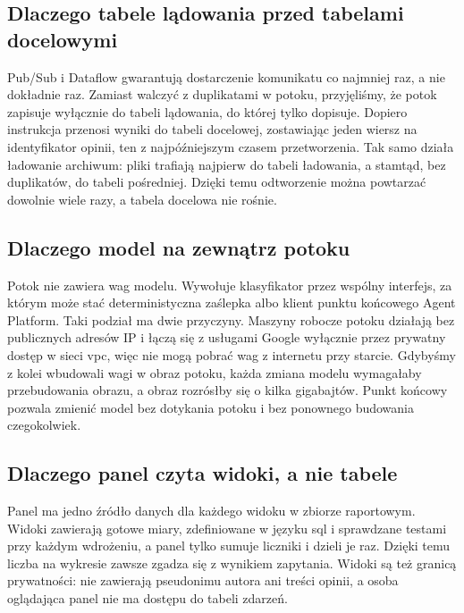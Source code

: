 \subsection{Dlaczego tabele lądowania przed tabelami docelowymi}
\label{sec:design-landing}

Pub/Sub i Dataflow gwarantują dostarczenie komunikatu co najmniej raz, a nie dokładnie raz.
Zamiast walczyć z duplikatami w potoku, przyjęliśmy, że potok zapisuje wyłącznie do tabeli lądowania, do której tylko dopisuje.
Dopiero instrukcja  przenosi wyniki do tabeli docelowej, zostawiając jeden wiersz na identyfikator opinii, ten z najpóźniejszym czasem przetworzenia.
Tak samo działa ładowanie archiwum: pliki trafiają najpierw do tabeli ładowania, a stamtąd, bez duplikatów, do tabeli pośredniej.
Dzięki temu odtworzenie można powtarzać dowolnie wiele razy, a tabela docelowa nie rośnie.

\subsection{Dlaczego model na zewnątrz potoku}
\label{sec:design-remote-model}

Potok nie zawiera wag modelu.
Wywołuje klasyfikator przez wspólny interfejs, za którym może stać deterministyczna zaślepka albo klient punktu końcowego Agent Platform.
Taki podział ma dwie przyczyny.
Maszyny robocze potoku działają bez publicznych adresów IP i łączą się z usługami Google wyłącznie przez prywatny dostęp w sieci \ac{vpc}, więc nie mogą pobrać wag z internetu przy starcie.
Gdybyśmy z kolei wbudowali wagi w obraz potoku, każda zmiana modelu wymagałaby przebudowania obrazu, a obraz rozrósłby się o kilka gigabajtów.
Punkt końcowy pozwala zmienić model bez dotykania potoku i bez ponownego budowania czegokolwiek.

\subsection{Dlaczego panel czyta widoki, a nie tabele}
\label{sec:design-views}

Panel ma jedno źródło danych dla każdego widoku w zbiorze raportowym.
Widoki zawierają gotowe miary, zdefiniowane w języku \ac{sql} i sprawdzane testami przy każdym wdrożeniu, a panel tylko sumuje liczniki i dzieli je raz.
Dzięki temu liczba na wykresie zawsze zgadza się z wynikiem zapytania.
Widoki są też granicą prywatności: nie zawierają pseudonimu autora ani treści opinii, a osoba oglądająca panel nie ma dostępu do tabeli zdarzeń.

